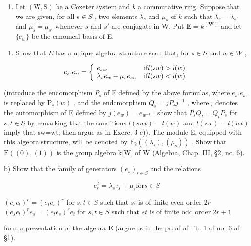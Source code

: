 \begin{enumerate}
\def\labelenumi{\arabic{enumi})}
\setcounter{enumi}{22}
\tightlist
\item
  Let \((\mathrm{W},\mathrm{S})\) be a Coxeter system and \(k\) a commutative ring. Suppose that we are given, for all \(s\in S\) , two elements \(\lambda_{s}\) and \(\mu_s\) of \(k\) such that \(\lambda_{s} = \lambda_{s'}\) and \(\mu_{s} = \mu_{s'}\) whenever \(s\) and \(s'\) are conjugate in W. Put \(\mathbf{E} = k^{(\mathbf{W})}\) and let \(\{e_w\}\) be the canonical basis of E.
\end{enumerate}

\begin{enumerate}
\def\labelenumi{\alph{enumi})}
\tightlist
\item
  Show that \(E\) has a unique algebra structure such that, for \(s \in S\) and \(w \in W\) ,
\end{enumerate}

\[
e _ {s}. e _ {w} = \left\{ \begin{array}{l l} e _ {s w} & \text {if} l (s w) > l (w) \\ \lambda_ {s} e _ {w} + \mu_ {s} e _ {s w} & \text {if} l (s w) <   l (w) \end{array} \right.
\]

(introduce the endomorphism \(P_{s}\) of E defined by the above formulas, where \(e_{s}.e_{w}\) is replaced by \(\mathrm{P}_{s}(w)\) , and the endomorphism \(Q_{s}=jP_{s}j^{-1}\) , where j denotes the automorphism of E defined by \(j(e_{w})=e_{w^{-1}}\) ; show that \(P_{s}Q_{t}=Q_{t}P_{s}\) for \(s,t\in S\) by remarking that the conditions \(l(swt)=l(w)\) and \(l(sw)=l(wt)\) imply that sw=wt; then argue as in Exerc. 3 c)). The module E, equipped with this algebra structure, will be denoted by \(\mathrm{E}_{k}((\lambda_{s}),(\mu_{s}))\) . Show that \(\mathrm{E}((0),(1))\) is the group algebra k{[}W{]} of W (Algebra, Chap. III, §2, no. 6).

b) Show that the family of generators \((e_s)_{s\in S}\) and the relations

\[
e _ {s} ^ {2} = \lambda_ {s} e _ {s} + \mu_ {s} \mathrm{for} s \in S
\]

\((e_s e_t)^r = (e_t e_s)^r\) for \(s, t \in S\) such that \(st\) is of finite even order \(2r\) \((e_s e_t)^r e_s = (e_t e_s)^r e_t\) for \(s, t \in S\) such that \(st\) is of finite odd order \(2r + 1\)

form a presentation of the algebra \(\mathbf{E}\) (argue as in the proof of Th. 1 of no. 6 of §1).

